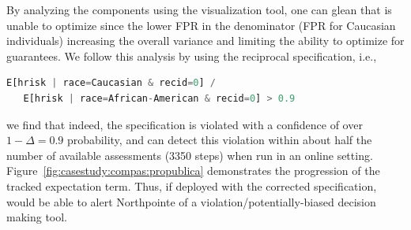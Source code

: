 By analyzing the components using the visualization tool, one can glean that \AVOIRmethodname{} is unable to optimize since the lower FPR in the denominator (FPR for Caucasian individuals) increasing the overall variance and limiting the ability to optimize for guarantees. 
We follow this analysis by using the reciprocal specification, i.e.,
\begin{lstlisting}[columns=flexible, language=Python]
   E[hrisk | race=Caucasian & recid=0] /
   E[hrisk | race=African-American & recid=0] > 0.9
\end{lstlisting}

we find that indeed, the specification is violated with a confidence of over $1 - \Delta = 0.9$ probability, and \AVOIRmethodname{} can detect this violation within about half the number of available assessments (3350 steps) when run in an online setting.
Figure~\ref{fig:casestudy:compas:propublica} demonstrates the progression of the tracked expectation term. 
Thus, if deployed with the corrected specification, \AVOIRmethodname{} would be able to alert Northpointe of a violation/potentially-biased decision making tool.

